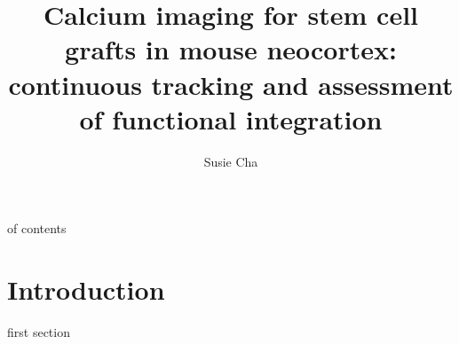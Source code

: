 \title{Calcium imaging for stem cell grafts in mouse neocortex: continuous tracking and assessment of functional integration}
\author{Susie Cha}



\maketitle

\table of contents

\section{Introduction}

first section

